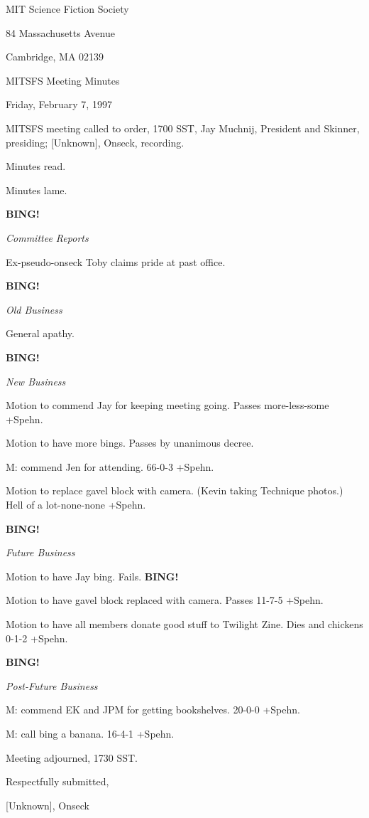 \documentclass[12pt]{article}
\newcommand{\bing}{{\bf BING!} }
\newcommand{\goto}[1]{\bing \vskip 12pt \centerline{{\em{#1}}}}
\begin{document}
\begin{center}

MIT Science Fiction Society 

84 Massachusetts Avenue

Cambridge, MA 02139

\vspace{12pt}

MITSFS Meeting Minutes 

Friday, February 7, 1997

\end{center}
 
\vspace{18pt}

\setlength{\parskip}{6pt}

\noindent
MITSFS meeting called to order, 1700 SST,
Jay Muchnij, President and Skinner, presiding; [Unknown], Onseck, recording.

Minutes read.

Minutes lame.

\goto{Committee Reports}

Ex-pseudo-onseck Toby claims pride at past office.

\goto{Old Business}

General apathy.

\goto{New Business}

Motion to commend Jay for keeping meeting going. Passes more-less-some +Spehn.

Motion to have more bings. Passes by unanimous decree.

M: commend Jen for attending. 66-0-3 +Spehn.

Motion to replace gavel block with camera. (Kevin taking Technique photos.) Hell of a lot-none-none +Spehn.

\goto{Future Business}

Motion to have Jay bing. Fails. \bing

Motion to have gavel block replaced with camera. Passes 11-7-5 +Spehn.

Motion to have all members donate good stuff to Twilight Zine. Dies and chickens 0-1-2 +Spehn.

\goto{Post-Future Business}

M: commend EK and JPM for getting bookshelves. 20-0-0 +Spehn.

M: call bing a banana. 16-4-1 +Spehn.

\vspace{12pt}

\noindent
Meeting adjourned, 1730 SST.

\vspace{18pt}

\centerline{Respectfully submitted,}
\centerline{[Unknown], Onseck}
\end{document}
